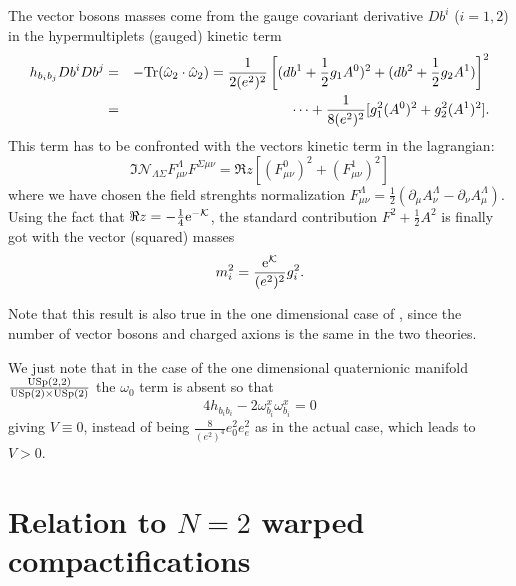 \documentclass[a4paper,12pt]{article}
\begin{document}
The vector bosons masses come from the gauge covariant derivative $Db^i$ ($i=1,2$) in the hypermultiplets (gauged) kinetic term
\begin{eqnarray}
h_{b_ib_j} Db^i Db^j&=&  -{\rm Tr}(\hat \omega_2 \cdot \hat \omega_2)
= \frac 1 {2(e^2)^2}  \left[(db^1 + \frac 12 g_1 A^0)^2+ (db^2 + \frac 12 g_2 A^1)\right]^2 \nonumber\\
&=& \cdots + \frac 1{8(e^2)^2}[g_1^2 (A^0)^2 + g_2^2 (A^1)^2].
\end{eqnarray}
This term has to be confronted with the vectors kinetic term in the lagrangian:
\begin{equation}
\Im {\mathcal N}_{\Lambda\Sigma}F^\Lambda_{\mu\nu}F^{\Sigma \mu\nu}= \Re z [(F^0_{\mu\nu})^2 +(F^1_{\mu\nu})^2]
\end{equation}
where we have chosen the field strenghts normalization $F_{\mu\nu}^\Lambda =\frac 12 (\partial _\mu A_\nu^\Lambda - \partial _\nu A_\mu^\Lambda)$.
Using the fact that $\Re z=- \frac 14 {\rm e}^{-{\mathcal K}}$,  the standard contribution $F^2 + \frac 12 A^2$
is finally got with the vector (squared) masses
\begin{equation}
m_i^2 = \frac{{\rm e}^{\mathcal K}}{(e^2)^2} g_i^2.
\end{equation}

Note that this result is also true in the one dimensional case of \cite{fp2}, since the number of vector bosons and charged axions
is the same in the two theories.


\bigskip

We just note that in the case of the one dimensional quaternionic manifold
$\frac{\mathrm{USp}(2,2)}{\mathrm{USp}(2)\times \mathrm{USp}(2)}$ \cite{cgp2,fgp} the $\omega_0$ term is absent so that
\begin{equation}
4h_{b_ib_i} -2 \omega^x_{b_i} \omega^x_{b_i} =0
\end{equation}
giving $V\equiv 0$, instead of being $\frac 8{(e^2)^4} e_0^2 e_e^2$ as in the actual case, which leads to $V>0$.

\section{Relation to $N=2$ warped compactifications}
\end{document}
